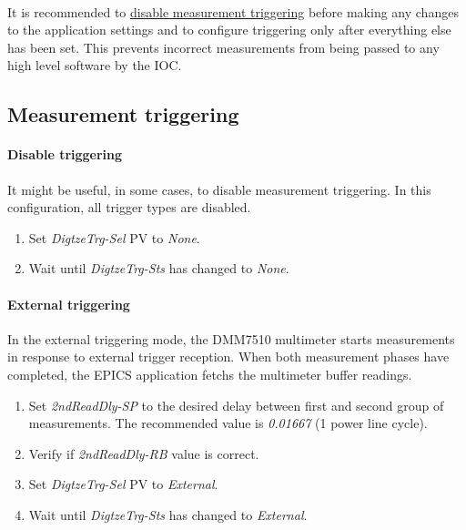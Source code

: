 \documentclass[openany]{article}
\begin{document}
	\paragraph{} It is recommended to \hyperref[disable-triggering]{disable measurement triggering} before making any changes to the application settings and to configure triggering only after everything else has been set. This prevents incorrect measurements from being passed to any high level software by the IOC.

	\subsection{Measurement triggering}

		\paragraph{Disable triggering}\label{disable-triggering} It might be useful, in some cases, to disable measurement triggering. In this configuration, all trigger types are disabled.

			\begin{enumerate}
			\item Set \emph{DigtzeTrg-Sel} PV to \emph{None}.
			\item Wait until \emph{DigtzeTrg-Sts} has changed to \emph{None}.
			\end{enumerate}

		\paragraph{External triggering} In the external triggering mode, the DMM7510 multimeter starts measurements in response to external trigger reception. When both measurement phases have completed, the EPICS application fetchs the multimeter buffer readings.

			\begin{enumerate}
			\item Set \emph{2ndReadDly-SP} to the desired delay between first and second group of measurements. The recommended value is \emph{0.01667} (1 power line cycle).
			\item Verify if \emph{2ndReadDly-RB} value is correct.
			\item Set \emph{DigtzeTrg-Sel} PV to \emph{External}.
			\item Wait until \emph{DigtzeTrg-Sts} has changed to \emph{External}.
			\end{enumerate}
\end{document}
